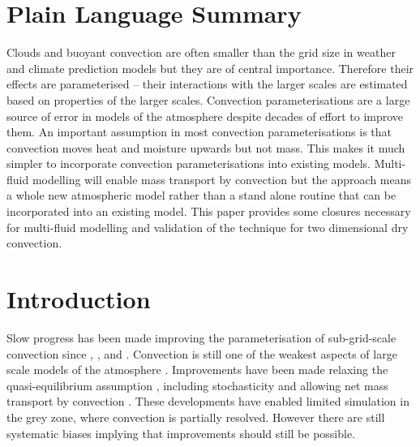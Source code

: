 \documentclass[draft]{agujournal2019}
\begin{document}
\section*{Plain Language Summary}
Clouds and buoyant convection are often smaller than the grid size in weather and climate prediction models but they are of central importance. Therefore their effects are parameterised -- their interactions with the larger scales are estimated based on properties of the larger scales. Convection parameterisations are a large source of error in models of the atmosphere despite decades of effort to improve them. An important assumption in most convection parameterisations is that convection moves heat and moisture upwards but not mass. This makes it much simpler to incorporate convection parameterisations into existing models. Multi-fluid modelling will enable mass transport by convection but the approach means a whole new atmospheric model rather than a stand alone routine that can be incorporated into an existing model. This paper provides some closures necessary for multi-fluid modelling and validation of the technique for two dimensional dry convection.

\section{Introduction}

Slow progress has been made improving the parameterisation of sub-grid-scale
convection since , ,  and . Convection is still
one of the weakest aspects of large scale models of the atmosphere
\cite{HPB+14,SAB+13,ipcc41}. Improvements have been made relaxing
the quasi-equilibrium assumption \cite{PR98,GG05,Par14}, including
stochasticity \cite{PC08} and allowing net mass transport by convection
\cite{KB08,MB19}. These developments have enabled limited simulation
in the grey zone, where convection is partially resolved. However
there are still systematic biases implying that improvements should
still be possible.
\end{document}
